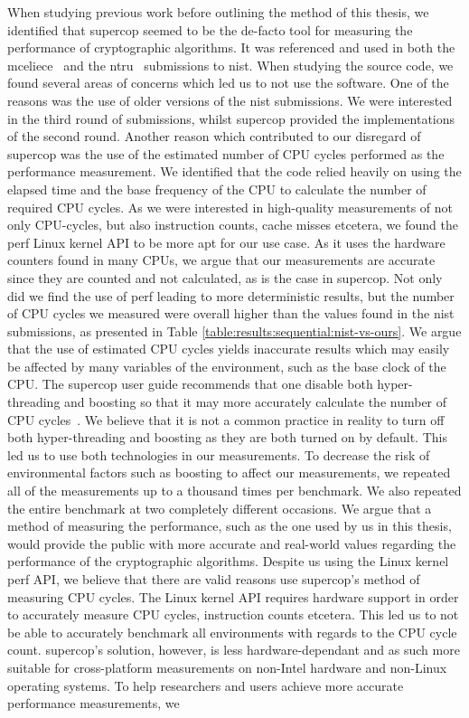 When studying previous work before outlining the method of this thesis, we identified that \gls{supercop} seemed to be the de-facto tool for measuring the performance of cryptographic algorithms. It was referenced and used in both the \gls{mceliece}~\cite{mceliece2020} and the \gls{ntru}~\cite{ntru2020} submissions to \gls{nist}. When studying the source code, we found several areas of concerns which led us to not use the software. One of the reasons was the use of older versions of the \gls{nist} submissions. We were interested in the third round of submissions, whilst \gls{supercop} provided the implementations of the second round. Another reason which contributed to our disregard of \gls{supercop} was the use of the estimated number of CPU cycles performed as the performance measurement. We identified that the code relied heavily on using the elapsed time and the base frequency of the CPU to calculate the number of required CPU cycles. As we were interested in high-quality measurements of not only CPU-cycles, but also instruction counts, cache misses etcetera, we found the perf Linux kernel API to be more apt for our use case. As it uses the hardware counters found in many CPUs, we argue that our measurements are accurate since they are counted and not calculated, as is the case in \gls{supercop}. Not only did we find the use of perf leading to more deterministic results, but the number of CPU cycles we measured were overall higher than the values found in the \gls{nist} submissions, as presented in Table \ref{table:results:sequential:nist-vs-ours}. We argue that the use of estimated CPU cycles yields inaccurate results which may easily be affected by many variables of the environment, such as the base clock of the CPU. The \gls{supercop} user guide recommends that one disable both hyper-threading and boosting so that it may more accurately calculate the number of CPU cycles~\cite{supercop}. We believe that it is not a common practice in reality to turn off both hyper-threading and boosting as they are both turned on by default. This led us to use both technologies in our measurements. To decrease the risk of environmental factors such as boosting to affect our measurements, we repeated all of the measurements up to a thousand times per benchmark. We also repeated the entire benchmark at two completely different occasions. We argue that a method of measuring the performance, such as the one used by us in this thesis, would provide the public with more accurate and real-world values regarding the performance of the cryptographic algorithms. Despite us using the Linux kernel perf API, we believe that there are valid reasons use \gls{supercop}'s method of measuring CPU cycles. The Linux kernel API requires hardware support in order to accurately measure CPU cycles, instruction counts etcetera. This led us to not be able to accurately benchmark all environments with regards to the CPU cycle count. \gls{supercop}'s solution, however, is less hardware-dependant and as such more suitable for cross-platform measurements on non-Intel hardware and non-Linux operating systems. To help researchers and users achieve more accurate performance measurements, we 